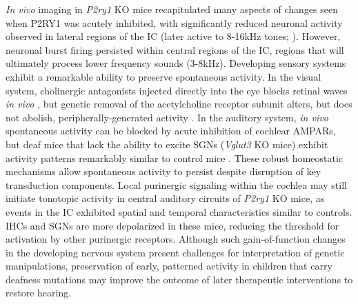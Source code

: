 \documentclass[9pt,lineno]{elife}
\begin{document}
\textit{In vivo} imaging in \textit{P2ry1} KO mice recapitulated many aspects of changes seen when P2RY1 was acutely inhibited, with significantly reduced neuronal activity observed in lateral regions of the IC (later active to 8-16kHz tones; ). However, neuronal burst firing persisted within central regions of the IC, regions that will ultimately process lower frequency sounds (3-8kHz). Developing sensory systems exhibit a remarkable ability to preserve spontaneous activity. In the visual system, cholinergic antagonists injected directly into the eye blocks retinal waves \textit{in vivo} \citep{Ackman2012}, but genetic removal of the  acetylcholine receptor subunit alters, but does not abolish, peripherally-generated activity \citep{Zhang2012}. In the auditory system, \textit{in vivo} spontaneous activity can be blocked by acute inhibition of cochlear AMPARs, but deaf mice that lack the ability to excite SGNs (\textit{Vglut3} KO mice) exhibit activity patterns remarkably similar to control mice \citep{Babola2018}. These robust homeostatic mechanisms allow spontaneous activity to persist despite disruption of key transduction components. Local purinergic signaling within the cochlea may still initiate tonotopic activity in central auditory circuits of \textit{P2ry1} KO mice, as events in the IC exhibited spatial and temporal characteristics similar to controls. IHCs and SGNs are more depolarized in these mice, reducing the threshold for activation by other purinergic receptors. Although such gain-of-function changes in the developing nervous system present challenges for interpretation of genetic manipulations, preservation of early, patterned activity in children that carry deafness mutations may improve the outcome of later therapeutic interventions to restore hearing. 
\end{document}
